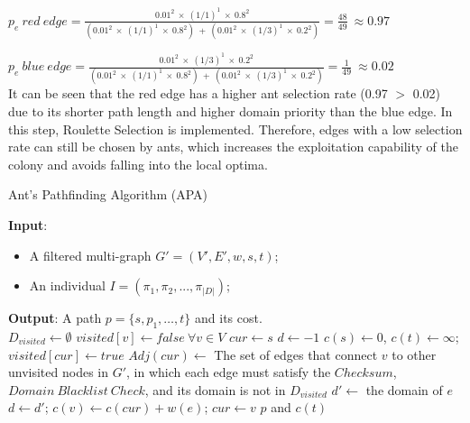 \bigskip
$
p_e~red~edge = \frac{0.01^2~\times~(1/1)^1~\times~0.8^2}{(0.01^2~\times~(1/1)^1~\times~0.8^2)~+~(0.01^2~\times~(1/3)^1~\times~0.2^2)} = \frac{48}{49}~\approx0.97
$
\bigskip

$
p_e~blue~edge = \frac{0.01^2~\times~(1/3)^1~\times~0.2^2}{(0.01^2~\times~(1/1)^1~\times~0.8^2)~+~(0.01^2~\times~(1/3)^1~\times~0.2^2)} = \frac{1}{49}~\approx0.02
$ \\ 

It can be seen that the red edge has a higher ant selection rate (0.97 $>$ 0.02) due to its shorter path length and higher domain priority than the blue edge. In this step, Roulette Selection is implemented. Therefore, edges with a low selection rate can still be chosen by ants, which increases the exploitation capability of the colony and avoids falling into the local optima.

\begin{algorithm}
	\caption{Ant's Pathfinding Algorithm (APA)}
	\label{alg:apa}
	\textbf{Input}:	
	\begin{itemize}
		\item A filtered multi-graph $G' = (V', E', w, s, t)$;
		\item An individual $I = (\pi_1, \pi_2,...,\pi_{|D|})$;
	\end{itemize}
	\textbf{Output}: A path $p = \{s, p_1, \dots, t\}$ and its cost. \\
	\Begin
	{	
		$D_{visited} \leftarrow\emptyset$ \;
		$visited[v] \leftarrow false~\forall v \in V$ \;
		$cur \leftarrow s$ \;
		$d \leftarrow  -1$ \;
		$c(s) \leftarrow 0$, $c(t) \leftarrow \infty$;\\
		{
			$visited[cur] \leftarrow true$\;
			$Adj(cur) \leftarrow$ The set of edges that connect $v$ to other unvisited nodes in $G'$, in which each edge must satisfy the $Checksum$, $Domain~Blacklist~Check$, and its domain is not in $D_{visited}$\;
			$d' \leftarrow$ the domain of $e$\;
			$d \leftarrow d'$; $c(v) \leftarrow c(cur) + w(e)$;  $cur \leftarrow v$\; 
		}
		\Return $p$ and $c(t)$\;
	}
\end{algorithm}

